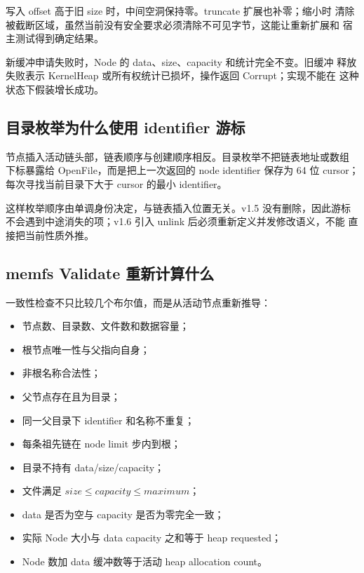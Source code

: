 写入 offset 高于旧 size 时，中间空洞保持零。truncate 扩展也补零；缩小时
清除被截断区域，虽然当前没有安全要求必须清除不可见字节，这能让重新扩展和
宿主测试得到确定结果。

\begin{failurebox}
新缓冲申请失败时，Node 的 data、size、capacity 和统计完全不变。旧缓冲
释放失败表示 KernelHeap 或所有权统计已损坏，操作返回 Corrupt；实现不能在
这种状态下假装增长成功。
\end{failurebox}

\subsection{目录枚举为什么使用 identifier 游标}

节点插入活动链头部，链表顺序与创建顺序相反。目录枚举不把链表地址或数组
下标暴露给 OpenFile，而是把上一次返回的 node identifier 保存为 64 位
cursor；每次寻找当前目录下大于 cursor 的最小 identifier。

这样枚举顺序由单调身份决定，与链表插入位置无关。v1.5 没有删除，因此游标
不会遇到中途消失的项；v1.6 引入 unlink 后必须重新定义并发修改语义，不能
直接把当前性质外推。

\subsection{memfs Validate 重新计算什么}

一致性检查不只比较几个布尔值，而是从活动节点重新推导：

\begin{itemize}
  \item 节点数、目录数、文件数和数据容量；
  \item 根节点唯一性与父指向自身；
  \item 非根名称合法性；
  \item 父节点存在且为目录；
  \item 同一父目录下 identifier 和名称不重复；
  \item 每条祖先链在 node limit 步内到根；
  \item 目录不持有 data/size/capacity；
  \item 文件满足 \(size\le capacity\le maximum\)；
  \item data 是否为空与 capacity 是否为零完全一致；
  \item 实际 Node 大小与 data capacity 之和等于 heap requested；
  \item Node 数加 data 缓冲数等于活动 heap allocation count。
\end{itemize}

